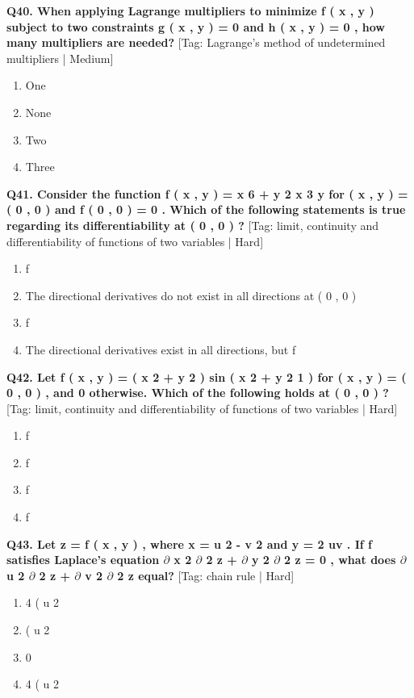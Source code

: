 \noindent\textbf{Q40. When applying Lagrange multipliers to minimize f ( x , y ) subject to two constraints g ( x , y ) = 0 and h ( x , y ) = 0 , how many multipliers are needed?} \hfill [Tag: Lagrange's method of undetermined multipliers | Medium]
\begin{enumerate}[label=(\alph*),topsep=2pt,itemsep=1pt,partopsep=0pt,parsep=0pt]
    \item {{One}}
    \item {{None}}
    \item {{Two}}
    \item {{Three}}
\end{enumerate}
\vspace{2mm}

\noindent\textbf{Q41. Consider the function f ( x , y ) = x 6 + y 2 x 3 y for ( x , y )  = ( 0 , 0 ) and f ( 0 , 0 ) = 0 . Which of the following statements is true regarding its differentiability at ( 0 , 0 ) ?} \hfill [Tag: limit, continuity and differentiability of functions of two variables | Hard]
\begin{enumerate}[label=(\alph*),topsep=2pt,itemsep=1pt,partopsep=0pt,parsep=0pt]
    \item {{f}}
    \item {{The directional derivatives do not exist in all directions at ( 0 , 0 )}}
    \item {{f}}
    \item {{The directional derivatives exist in all directions, but f}}
\end{enumerate}
\vspace{2mm}

\noindent\textbf{Q42. Let f ( x , y ) = ( x 2 + y 2 ) sin ( x 2 + y 2 1 ) for ( x , y )  = ( 0 , 0 ) , and 0 otherwise. Which of the following holds at ( 0 , 0 ) ?} \hfill [Tag: limit, continuity and differentiability of functions of two variables | Hard]
\begin{enumerate}[label=(\alph*),topsep=2pt,itemsep=1pt,partopsep=0pt,parsep=0pt]
    \item {{f}}
    \item {{f}}
    \item {{f}}
    \item {{f}}
\end{enumerate}
\vspace{2mm}

\noindent\textbf{Q43. Let z = f ( x , y ) , where x = u 2 - v 2 and y = 2 uv . If f satisfies Laplace's equation $\partial$ x 2 $\partial$ 2 z + $\partial$ y 2 $\partial$ 2 z = 0 , what does $\partial$ u 2 $\partial$ 2 z + $\partial$ v 2 $\partial$ 2 z equal?} \hfill [Tag: chain rule | Hard]
\begin{enumerate}[label=(\alph*),topsep=2pt,itemsep=1pt,partopsep=0pt,parsep=0pt]
    \item {{4 ( u 2}}
    \item {{( u 2}}
    \item {{0}}
    \item {{4 ( u 2}}
\end{enumerate}
\vspace{2mm}

